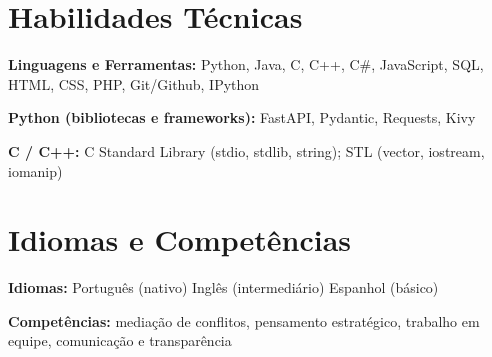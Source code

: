\documentclass[a4paper,11pt]{article}
\newcommand{\skill}[2]{\noindent\textbf{#1:} #2\par\vspace{2pt}}
\begin{document}
\section{Habilidades Técnicas}
\skill{Linguagens e Ferramentas}{Python, Java, C, C++, C\#, JavaScript, SQL, HTML, CSS, PHP, Git/Github, IPython}
\skill{Python (bibliotecas e frameworks)}{FastAPI, Pydantic, Requests, Kivy}
\skill{C / C++}{C Standard Library (stdio, stdlib, string); STL (vector, iostream, iomanip)}

\section{Idiomas e Competências}
\skill{Idiomas}{Português (nativo) \textbar{} Inglês (intermediário) \textbar{} Espanhol (básico)}
\skill{Competências}{mediação de conflitos, pensamento estratégico, trabalho em equipe, comunicação e transparência}
\end{document}
